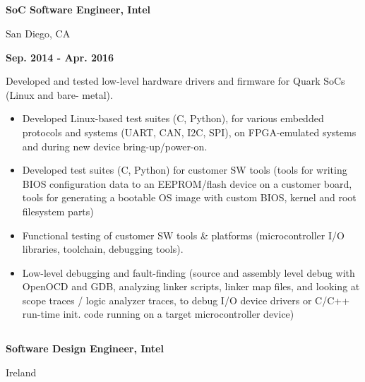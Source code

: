 \documentclass[6pt]{article}
\begin{document}
\begin{minipage}{50em}
\dotfill

%
%
\subsection*{}
\begin{minipage}{20em}
{\bfseries SoC Software Engineer, Intel

San Diego, CA}

\end{minipage}
\hfill
\begin{minipage}{28em}
{\bfseries \hfill Sep. 2014 - Apr. 2016}
\end{minipage}
\break
\break
Developed and tested low-level hardware drivers and firmware for Quark SoCs (Linux and bare-
metal).
\begin{itemize}
    \item Developed Linux-based test suites (C, Python), for various embedded protocols and
          systems (UART, CAN, I2C, SPI), on FPGA-emulated systems and during new device
          bring-up/power-on.
    \item Developed test suites (C, Python) for customer SW tools (tools for writing BIOS
          configuration data to an EEPROM/flash device on a customer board, tools for
          generating a bootable OS image with custom BIOS, kernel and root filesystem parts)
    \item Functional testing of customer SW tools \& platforms (microcontroller I/O libraries, toolchain,
          debugging tools).
    \item Low-level debugging and fault-finding (source and assembly level debug with OpenOCD and GDB,
          analyzing linker scripts, linker map files, and looking at scope traces / logic analyzer traces, to
          debug I/O device drivers or C/C++ run-time init. code running on a target microcontroller device)
\end{itemize}
\dotfill

%
%
\subsection*{}
\begin{minipage}{20em}
{\bfseries Software Design Engineer, Intel

Ireland}


\end{minipage}
\end{minipage}
\end{document}
